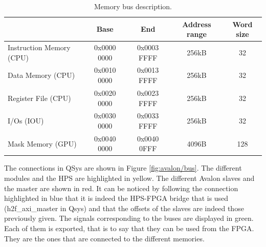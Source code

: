\begin{table}[ht!]
    \centering
    \begin{tabular}{|l|c|c|c|c|}
    \hline
    \rowcolor[HTML]{DAE8FC} 
    \multicolumn{1}{|c|}{\cellcolor[HTML]{DAE8FC}\textbf{Access}} & \textbf{Base} & \textbf{End} & \textbf{Address range} & \textbf{Word size} \\ \hline
    Instruction Memory (CPU)                                      & 0x0000 0000   & 0x0003 FFFF  & 256kB             & 32                 \\ \hline
    Data Memory (CPU)                                             & 0x0010 0000   & 0x0013 FFFF  & 256kB             & 32                 \\ \hline
    Register File (CPU)                                           & 0x0020 0000   & 0x0023 FFFF  & 256kB             & 32                 \\ \hline
    I/Os (IOU)                                                    & 0x0030 0000   & 0x0033 FFFF  & 256kB             & 32                 \\ \hline
    Mask Memory (GPU)                                             & 0x0040 0000   & 0x0040 0FFF  & 4096B             & 128                \\ \hline
    \end{tabular}
    \caption{Memory bus description.}
    \label{mau/bus}
\end{table}

The connections in QSys are shown in Figure \ref{fig:avalon/bus}. 
The different modules and the HPS are highlighted in 
yellow. The different Avalon slaves and the master are shown in red. It can be noticed by following 
the connection highlighted in blue that it is indeed the HPS-FPGA bridge that is used 
(h2f\_axi\_master in Qsys) and that the offsets of the slaves are indeed those previously given. The 
signals corresponding to the buses are displayed in green. Each of them is exported, that is to say 
that they can be used from the FPGA. They are the ones that are connected to the different memories.

